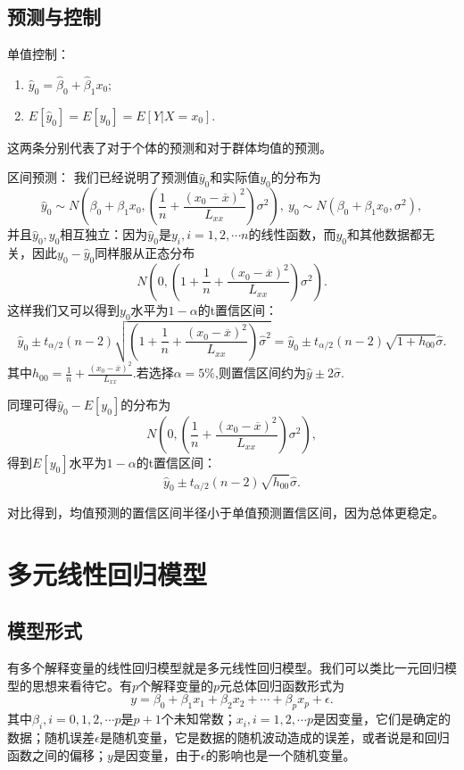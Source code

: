 \documentclass[lang=cn,10pt]{elegantbook}
\begin{document}
    \subsection{预测与控制}
    单值控制：
    \begin{enumerate}
        \item \(\hat{y}_0=\hat{\beta}_0+\hat{\beta}_1x_0;\)
        \item \(E[\hat{y}_0]=E[y_0]=E[Y|X=x_0].\)
    \end{enumerate}
    这两条分别代表了对于个体的预测和对于群体均值的预测。

    区间预测：
    我们已经说明了预测值\(\hat{y}_0\)和实际值\(y_0\)的分布为
    \[\hat{y}_0\sim N(\beta_0+\beta_1x_0,(\frac{1}{n}+\frac{(x_0-\overline{x})^2}{L_{xx}})\sigma^2),\ y_0\sim N(\beta_0+\beta_1x_0,\sigma^2),\]
    并且\(\hat{y}_0,y_0\)相互独立：因为\(\hat{y}_0\)是\(y_i,i=1,2,\cdots n\)的线性函数，而\(y_0\)和其他数据都无关，因此\(y_0-\hat{y}_0\)同样服从正态分布
    \[N(0,(1+\frac{1}{n}+\frac{(x_0-\overline{x})^2}{L_{xx}})\sigma^2).\]
    这样我们又可以得到\(y_0\)水平为\(1-\alpha\)的t置信区间：
    \[\hat{y}_0\pm t_{\alpha/2}(n-2)\sqrt{(1+\frac{1}{n}+\frac{(x_0-\overline{x})^2}{L_{xx}})\hat{\sigma}^2}=\hat{y}_0\pm t_{\alpha/2}(n-2)\sqrt{1+h_{00}}\hat{\sigma}.\]
    其中\(h_{00}=\frac{1}{n}+\frac{(x_0-\overline{x})^2}{L_{xx}}.\)若选择\(\alpha=5\%\),则置信区间约为\(\hat{y}\pm 2\hat{\sigma}\).

    同理可得\(\hat{y}_0-E[y_0]\)的分布为
    \[N(0,(\frac{1}{n}+\frac{(x_0-\overline{x})^2}{L_{xx}})\sigma^2),\]
    得到\(E[y_0]\)水平为\(1-\alpha\)的t置信区间：
    \[\hat{y}_0\pm t_{\alpha/2}(n-2)\sqrt{h_{00}}\hat{\sigma}.\]
    \begin{note}
        对比得到，均值预测的置信区间半径小于单值预测置信区间，因为总体更稳定。
    \end{note}
    \section{多元线性回归模型}
    \subsection{模型形式}
    有多个解释变量的线性回归模型就是多元线性回归模型。我们可以类比一元回归模型的思想来看待它。有\(p\)个解释变量的\(p\)元总体回归函数形式为
    \[y = \beta_0 + \beta_1x_1+\beta_2x_2+\cdots+\beta_px_p+\epsilon.\]
    其中\(\beta_i,i=0,1,2,\cdots p\)是\(p+1\)个未知常数；\(x_i,i=1,2,\cdots p\)是因变量，它们是确定的数据；随机误差\(\epsilon\)是随机变量，它是数据的随机波动造成的误差，或者说是和回归函数之间的偏移；\(y\)是因变量，由于\(\epsilon\)的影响也是一个随机变量。
\end{document}
